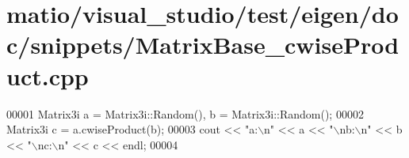 \hypertarget{matio_2visual__studio_2test_2eigen_2doc_2snippets_2_matrix_base__cwise_product_8cpp_source}{}\section{matio/visual\+\_\+studio/test/eigen/doc/snippets/\+Matrix\+Base\+\_\+cwise\+Product.cpp}
\label{matio_2visual__studio_2test_2eigen_2doc_2snippets_2_matrix_base__cwise_product_8cpp_source}

\begin{DoxyCode}
00001 Matrix3i a = Matrix3i::Random(), b = Matrix3i::Random();
00002 Matrix3i c = a.cwiseProduct(b);
00003 cout << \textcolor{stringliteral}{"a:\(\backslash\)n"} << a << \textcolor{stringliteral}{"\(\backslash\)nb:\(\backslash\)n"} << b << \textcolor{stringliteral}{"\(\backslash\)nc:\(\backslash\)n"} << c << endl;
00004 
\end{DoxyCode}
